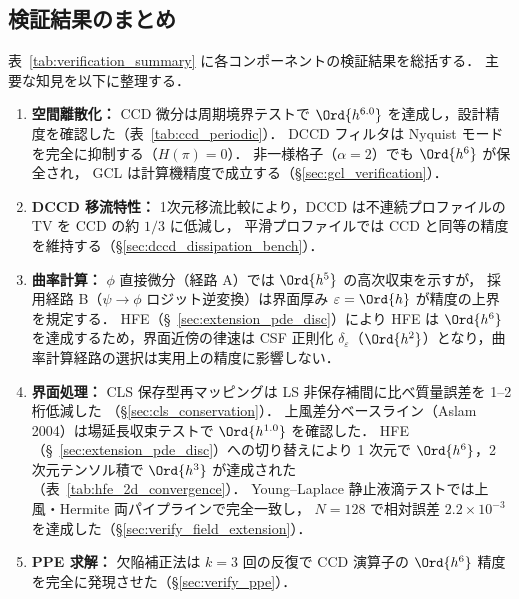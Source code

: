 %
\subsection{検証結果のまとめ}
\label{sec:verify_summary}

表~\ref{tab:verification_summary} に各コンポーネントの検証結果を総括する．
主要な知見を以下に整理する．

\begin{enumerate}
  \item \textbf{空間離散化：}
        CCD 微分は周期境界テストで $\Ord{h^{6.0}}$ を達成し，設計精度を確認した（表~\ref{tab:ccd_periodic}）．
        DCCD フィルタは Nyquist モードを完全に抑制する（$H(\pi)=0$）．
        非一様格子（$\alpha=2$）でも $\Ord{h^6}$ が保全され，
        GCL は計算機精度で成立する（§\ref{sec:gcl_verification}）．
  \item \textbf{DCCD 移流特性：}
        1次元移流比較により，DCCD は不連続プロファイルの TV を CCD の約 $1/3$ に低減し，
        平滑プロファイルでは CCD と同等の精度を維持する（§\ref{sec:dccd_dissipation_bench}）．
  \item \textbf{曲率計算：}
        $\phi$ 直接微分（経路 A）では $\Ord{h^5}$ の高次収束を示すが，
        採用経路 B（$\psi \to \phi$ ロジット逆変換）は界面厚み $\varepsilon = \Ord{h}$ が精度の上界を規定する．
        HFE（§~\ref{sec:extension_pde_disc}）により
        HFE は $\Ord{h^6}$ を達成するため，界面近傍の律速は
        CSF 正則化 $\delta_\varepsilon$（$\Ord{h^2}$）となり，曲率計算経路の選択は実用上の精度に影響しない．
  \item \textbf{界面処理：}
        CLS 保存型再マッピングは LS 非保存補間に比べ質量誤差を 1--2 桁低減した
        （§\ref{sec:cls_conservation}）．
        上風差分ベースライン（Aslam 2004）は場延長収束テストで $\Ord{h^{1.0}}$ を確認した．
        HFE（§~\ref{sec:extension_pde_disc}）への切り替えにより
        1 次元で $\Ord{h^6}$，2 次元テンソル積で $\Ord{h^3}$ が達成された
        （表~\ref{tab:hfe_2d_convergence}）．
        Young--Laplace 静止液滴テストでは上風・Hermite 両パイプラインで完全一致し，
        $N = 128$ で相対誤差 $2.2\times10^{-3}$ を達成した（§\ref{sec:verify_field_extension}）．
  \item \textbf{PPE 求解：}
        欠陥補正法は $k=3$ 回の反復で CCD 演算子の $\Ord{h^6}$ 精度を完全に発現させた（§\ref{sec:verify_ppe}）．

\end{enumerate}
